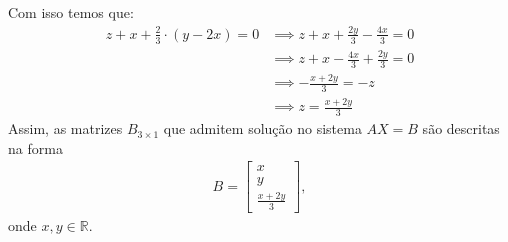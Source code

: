 Com isso temos que:
\begin{align*}
    z + x + \frac{2}{3} \cdot (y - 2x) = 0 & \implies 
    z + x + \frac{2y}{3} - \frac{4x}{3} = 0 \\ & \implies 
    z + x - \frac{4x}{3} + \frac{2y}{3} = 0 \\ & \implies
    -\frac{x + 2y}{3} = -z \\ & \implies
    z = \frac{x + 2y}{3} 
\end{align*}
Assim, as matrizes $B_{3\times1}$ que admitem solução no sistema $AX = B$ são descritas na forma
\begin{align*}
    B = \left[\begin{array}{c}
         x \\
         y \\
         \frac{x + 2y}{3}
    \end{array}\right],
\end{align*}
onde $x, y \in \mathbb{R}$.